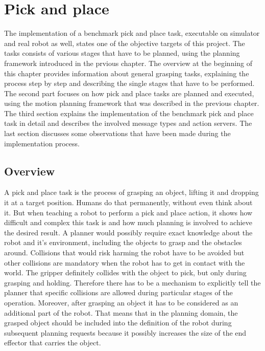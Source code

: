 
\chapter{Pick and place}
\label{chap:pick_place}

The implementation of a benchmark pick and place task, executable on simulator and real robot as well, states one of the objective targets of this project. The tasks consists of various stages that have to be planned, using the planning framework introduced in the prvious chapter. The overview at the beginning of this chapter provides information about general grasping tasks, explaining the process step by step and describing the single stages that have to be performed. The second part focuses on how pick and place tasks are planned and executed, using the motion planning framework that was described in the previous chapter. The third section explains the implementation of the benchmark pick and place task in detail and describes the involved message types and action servers. The last section discusses some observations that have been made during the implementation process.

\section{Overview}

A pick and place task is the process of grasping an object, lifting it and dropping it at a target position. Humans do that permanently, without even think about it. But when teaching a robot to perform a pick and place action, it shows how difficult and complex this task is and how much planning is involved to achieve the desired result. A planner would possibly require exact knowledge about the robot and it's environment, including the objects to grasp and the obstacles around. Collisions that would risk harming the robot have to be avoided but other collisions are mandatory when the robot has to get in contact with the world. The gripper definitely collides with the object to pick, but only during grasping and holding. Therefore there has to be a mechanism to explicitly tell the planner that specific collisions are allowed during particular stages of the operation. Moreover, after grasping an object it has to be considered as an additional part of the robot. That means that in the planning domain, the grasped object should be included into the definition of the robot during subsequent planning requests because it possibly increases the size of the end effector that carries the object. \\


